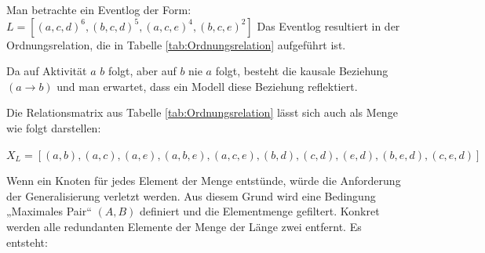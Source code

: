 Man betrachte ein Eventlog der Form: $L = [(a, c, d)^6, (b, c, d)^5, (a, c, e)^4, (b, c, e)^2]$
Das Eventlog resultiert in der Ordnungsrelation, die in Tabelle \ref{tab:Ordnungsrelation} aufgeführt ist.
\begin{table}[!ht]
\centering
{}
\caption{Ordnungsrelation zu einem Eventlog $L$ auf Basis des $\alpha$-Miner Verfahrens}
\label{tab:Ordnungsrelation}
\end{table}
\newline
Da auf Aktivität $a$ $b$ folgt, aber auf $b$ nie $a$ folgt, besteht die kausale Beziehung $(a→b)$ und man erwartet, dass ein Modell diese Beziehung reflektiert.

Die Relationsmatrix aus Tabelle \ref{tab:Ordnungsrelation} lässt sich auch als Menge wie folgt darstellen:

$ X_L={ [({a}, {b}), ({a}, {c}), ({a}, {e}), ({a}, {b, e}),
({a}, {c, e}), ({b}, {d}), ({c}, {d}), ({e}, {d}),
({b, e}, {d}), ({c, e}, {d}) ]}$

Wenn ein Knoten für jedes Element der Menge entstünde, würde die Anforderung der Generalisierung verletzt werden. Aus diesem Grund wird eine Bedingung „Maximales Pair“ $(A,B)$ definiert und die Elementmenge gefiltert. Konkret werden alle redundanten Elemente der Menge der Länge zwei entfernt. Es entsteht:

